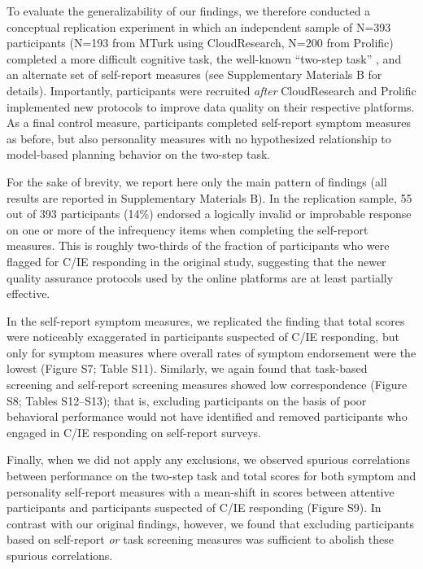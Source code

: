\documentclass[a4paper,notitlepage,12pt]{article}
\begin{document}
To evaluate the generalizability of our findings, we therefore conducted a conceptual replication experiment in which an independent sample of N=393 participants (N=193 from MTurk using CloudResearch, N=200 from Prolific) completed a more difficult cognitive task, the well-known ``two-step task'' \cite{daw2011model}, and an alternate set of self-report measures (see Supplementary Materials B for details). Importantly, participants were recruited \textit{after} CloudResearch and Prolific implemented new protocols to improve data quality on their respective platforms. As a final control measure, participants completed self-report symptom measures as before, but also personality measures with no hypothesized relationship to model-based planning behavior on the two-step task. 

For the sake of brevity, we report here only the main pattern of findings (all results are reported in Supplementary Materials B). In the replication sample, 55 out of 393 participants (14\%) endorsed a logically invalid or improbable response on one or more of the infrequency items when completing the self-report measures. This is roughly two-thirds of the fraction of participants who were flagged for C/IE responding in the original study, suggesting that the newer quality assurance protocols used by the online platforms are at least partially effective. 

In the self-report symptom measures, we replicated the finding that total scores were noticeably exaggerated in participants suspected of C/IE responding, but only for symptom measures where overall rates of symptom endorsement were the lowest (Figure S7; Table S11). Similarly, we again found that task-based screening and self-report screening measures showed low correspondence (Figure S8; Tables S12--S13); that is, excluding participants on the basis of poor behavioral performance would not have identified and removed participants who engaged in C/IE responding on self-report surveys. 

Finally, when we did not apply any exclusions, we observed spurious correlations between performance on the two-step task and total scores for both symptom and personality self-report measures with a mean-shift in scores between attentive participants and participants suspected of C/IE responding (Figure S9). In contrast with our original findings, however, we found that excluding participants based on self-report \textit{or} task screening measures was sufficient to abolish these spurious correlations. 
\end{document}
